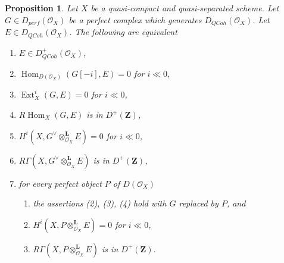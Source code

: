 \documentclass{stacks-project}
\theoremstyle{plain}
\newtheorem{proposition}[subsection]{Proposition}
\theoremstyle{definition}
\theoremstyle{remark}
\numberwithin{equation}{subsection}
\def\Hom{\mathop{\mathrm{Hom}}\nolimits}
\def\Ext{\mathop{\mathrm{Ext}}\nolimits}
\def\QCoh{\mathit{QCoh}}
\begin{document}
\begin{proposition}
\label{proposition-detecting-bounded-below}
Let $X$ be a quasi-compact and quasi-separated scheme.
Let $G \in D_{perf}(\mathcal{O}_X)$
be a perfect complex which generates $D_\QCoh (\mathcal{O}_X)$. Let
$E \in D_\QCoh (\mathcal{O}_X)$. The following are equivalent
\begin{enumerate}
\item $E \in D^+_\QCoh (\mathcal{O}_X)$,
\item $\Hom_{D(\mathcal{O}_X)}(G[-i], E) = 0$ for $i \ll 0$,
\item $\Ext^i_X(G, E) = 0$ for $i \ll 0$,
\item $R\Hom_X(G, E)$ is in $D^+(\mathbf{Z})$,
\item $H^i(X, G^\vee \otimes_{\mathcal{O}_X}^\mathbf{L} E) = 0$
for $i \ll 0$,
\item $R\Gamma(X, G^\vee \otimes_{\mathcal{O}_X}^\mathbf{L} E)$
is in $D^+(\mathbf{Z})$,
\item for every perfect object $P$ of $D(\mathcal{O}_X)$
\begin{enumerate}
\item the assertions (2), (3), (4) hold with $G$ replaced by $P$, and
\item $H^i(X, P \otimes_{\mathcal{O}_X}^\mathbf{L} E) = 0$ for $i \ll 0$,
\item $R\Gamma(X, P \otimes_{\mathcal{O}_X}^\mathbf{L} E)$
is in $D^+(\mathbf{Z})$.
\end{enumerate}
\end{enumerate}
\end{proposition}
\end{document}
